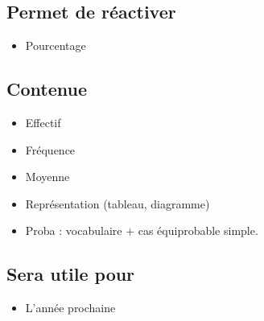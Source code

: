 \subsection{Permet de réactiver}
\begin{itemize}
    \item Pourcentage
\end{itemize}

\subsection{Contenue}
\begin{itemize}
    \item Effectif
    \item Fréquence
    \item Moyenne
    \item Représentation (tableau, diagramme)
    \item Proba : vocabulaire + cas équiprobable simple.
\end{itemize}

\subsection{Sera utile pour}
\begin{itemize}
    \item L'année prochaine
\end{itemize}